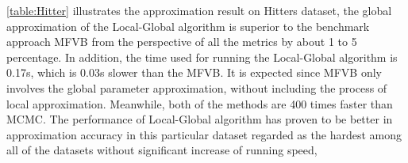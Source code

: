 \begin{table}[!h]
	\caption{Experiment Result on Hitters dataset}
	\label{table:Hitter}
\end{table}
\autoref{table:Hitter} illustrates the approximation result on Hitters dataset, the global approximation of the Local-Global algorithm is superior to the benchmark approach MFVB from the perspective of all the metrics by about 1 to 5 percentage. In addition, the time used for running the Local-Global algorithm  is 0.17s, which is 0.03s slower than the MFVB. It is expected since MFVB only involves the global parameter approximation, without including the process of local approximation. Meanwhile, both of the methods are 400 times faster than MCMC.
The performance of Local-Global algorithm has proven to be better in approximation accuracy in this particular dataset regarded as the hardest among all of the datasets without significant increase of running speed,
\begin{table}[!h]
	\caption{Experiment Result on Kakadu dataset}
	\label{table:Kakadu}
\end{table}

